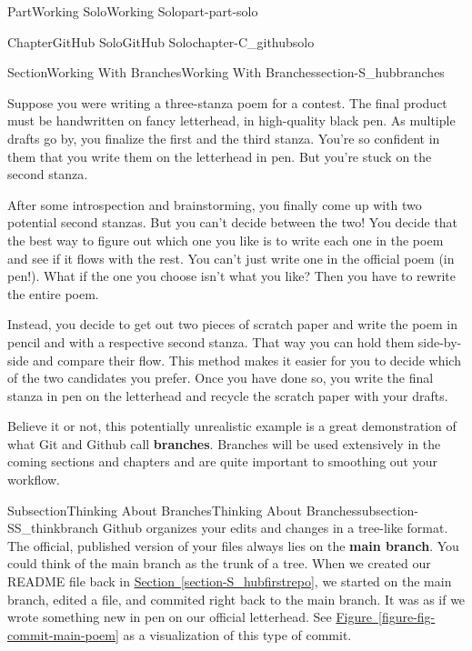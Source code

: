 \documentclass[oneside,10pt,]{book}
\newcommand{\xreffont}{\relax}
\newcommand{\terminology}[1]{\textbf{#1}}
\begin{document}
\begin{partptx}{Part}{Working Solo}{}{Working Solo}{}{}{part-part-solo}
\begin{chapterptx}{Chapter}{GitHub Solo}{}{GitHub Solo}{}{}{chapter-C_githubsolo}
\begin{sectionptx}{Section}{Working With Branches}{}{Working With Branches}{}{}{section-S_hubbranches}
\begin{introduction}{}%
Suppose you were writing a three-stanza poem for a contest. The final product must be handwritten on fancy letterhead, in high-quality black pen. As multiple drafts go by, you finalize the first and the third stanza. You're so confident in them that you write them on the letterhead in pen. But you're stuck on the second stanza.%
\par
After some introspection and brainstorming, you finally come up with two potential second stanzas. But you can't decide between the two! You decide that the best way to figure out which one you like is to write each one in the poem and see if it flows with the rest. You can't just write one in the official poem (in pen!). What if the one you choose isn't what you like? Then you have to rewrite the entire poem.%
\par
Instead, you decide to get out two pieces of scratch paper and write the poem in pencil and with a respective second stanza. That way you can hold them side-by-side and compare their flow. This method makes it easier for you to decide which of the two candidates you prefer. Once you have done so, you write the final stanza in pen on the letterhead and recycle the scratch paper with your drafts.%
\par
Believe it or not, this potentially unrealistic example is a great demonstration of what Git and Github call \terminology{branches}. Branches will be used extensively in the coming sections and chapters and are quite important to smoothing out your workflow.%
\end{introduction}%
%
%
\typeout{************************************************}
\typeout{************************************************}
%
\begin{subsectionptx}{Subsection}{Thinking About Branches}{}{Thinking About Branches}{}{}{subsection-SS_thinkbranch}
%
%
Github organizes your edits and changes in a tree-like format. The official, published version of your files always lies on the \terminology{main branch}. You could think of the main branch as the trunk of a tree. When we created our README file back in \hyperref[section-S_hubfirstrepo]{Section~{\xreffont\ref{section-S_hubfirstrepo}}}, we started on the main branch, edited a file, and commited right back to the main branch. It was as if we wrote something new in pen on our official letterhead. See \hyperref[figure-fig-commit-main-poem]{Figure~{\xreffont\ref{figure-fig-commit-main-poem}}} as a visualization of this type of commit.%

\end{subsectionptx}
\end{sectionptx}
\end{chapterptx}
\end{partptx}
\end{document}
